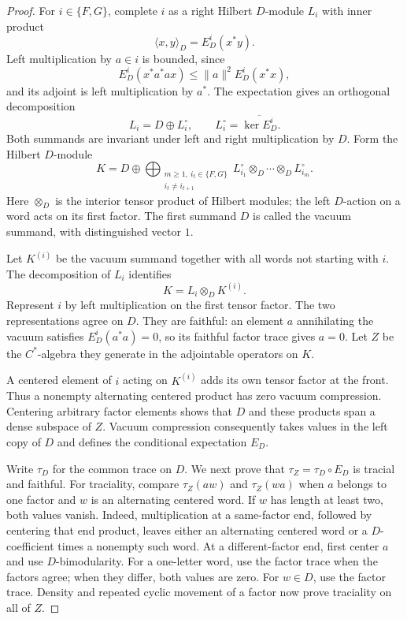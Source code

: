 \begin{proof}
For $i\in\{F,G\}$, complete $i$ as a right Hilbert $D$-module $L_i$
with inner product
\[
 \langle x,y\rangle_D=E_D^i(x^*y).
\]
Left multiplication by $a\in i$ is bounded, since
\[
 E_D^i(x^*a^*ax)\leq\|a\|^2E_D^i(x^*x),
\]
and its adjoint is left multiplication by $a^*$.  The expectation gives
an orthogonal decomposition
\[
 L_i=D\oplus L_i^\circ,
 \qquad L_i^\circ=\overline{\ker E_D^i}.
\]
Both summands are invariant under left and right multiplication by $D$.
Form the Hilbert $D$-module
\begin{equation}\label{na:free-module}
 K=D\oplus
 \bigoplus_{\substack{m\geq1,\ i_t\in\{F,G\}\\i_t\ne i_{t+1}}}
 L_{i_1}^\circ\otimes_D\cdots\otimes_D L_{i_m}^\circ.
\end{equation}
Here $\otimes_D$ is the interior tensor product of Hilbert modules; the
left $D$-action on a word acts on its first factor.  The first summand
$D$ is called the vacuum summand, with distinguished vector $1$.

Let $K^{(i)}$ be the vacuum summand together with all words not starting
with $i$.  The decomposition of $L_i$ identifies
\[
 K=L_i\otimes_D K^{(i)}.
\]
Represent $i$ by left multiplication on the first tensor factor.  The
two representations agree on $D$.  They are faithful: an element $a$
annihilating the vacuum satisfies $E_D^i(a^*a)=0$, so its faithful
factor trace gives $a=0$.  Let $Z$ be the $C^*$-algebra they generate in
the adjointable operators on $K$.

A centered element of $i$ acting on $K^{(i)}$ adds its own tensor
factor at the front.  Thus a nonempty alternating centered product has
zero vacuum compression.  Centering arbitrary factor elements shows
that $D$ and these products span a dense subspace of $Z$.  Vacuum
compression consequently takes values in the left copy of $D$ and
defines the conditional expectation $E_D$.

Write $\tau_D$ for the common trace on $D$.  We next prove that
$\tau_Z=\tau_D\circ E_D$ is tracial and faithful.  For traciality,
compare $\tau_Z(aw)$ and $\tau_Z(wa)$ when $a$ belongs to one factor
and $w$ is an alternating centered word.  If $w$ has length at least
two, both values vanish.  Indeed, multiplication at a same-factor end,
followed by centering that end product, leaves either an alternating
centered word or a $D$-coefficient times a nonempty such word.  At a
different-factor end, first center $a$ and use $D$-bimodularity.  For a
one-letter word, use the factor trace when the factors agree; when they
differ, both values are zero.  For $w\in D$, use the factor trace.
Density and repeated cyclic movement of a factor now prove traciality
on all of $Z$.


\end{proof}
